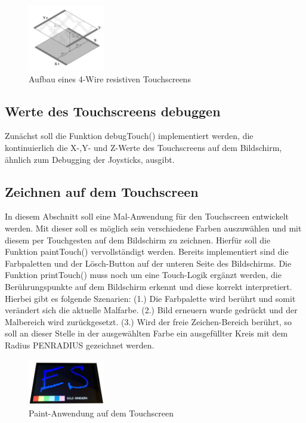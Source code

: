\begin{figure}[htbp]
	\centering
	\includegraphics[width=0.3\textwidth]{./05_c/figures/ResistiveTS.png}
	\caption{Aufbau eines 4-Wire resistiven Touchscreens }
	\label{fig:fourRSTouch}
\end{figure} 

\subsection{Werte des Touchscreens debuggen}
Zunächst soll die Funktion debugTouch() implementiert werden, die kontinuierlich die X-,Y- und Z-Werte des Touchscreens auf dem Bildschirm, ähnlich zum Debugging der Joysticks, ausgibt.

\subsection{Zeichnen auf dem Touchscreen}
In diesem Abschnitt soll eine Mal-Anwendung für den Touchscreen entwickelt werden. Mit dieser soll es möglich sein verschiedene Farben auszuwählen und mit diesem per Touchgesten auf dem Bildschirm zu zeichnen. Hierfür soll die Funktion paintTouch() vervollständigt werden. Bereits implementiert sind die Farbpaletten und der Lösch-Button auf der unteren Seite des Bildschirms. Die Funktion printTouch() muss noch um eine Touch-Logik ergänzt werden, die Berührungspunkte auf dem Bildschirm erkennt und diese korrekt interpretiert. Hierbei gibt es folgende Szenarien: 
(1.) Die Farbpalette wird berührt und somit verändert sich die aktuelle Malfarbe.
(2.) Bild erneuern wurde gedrückt und der Malbereich wird zurückgesetzt.
(3.) Wird der freie Zeichen-Bereich berührt, so soll an dieser Stelle in der ausgewählten Farbe ein ausgefüllter Kreis mit dem Radius PENRADIUS gezeichnet werden.
\begin{figure}[htbp]
	\centering
	\includegraphics[width=0.3\textwidth]{./05_c/figures/Paint-Szenario.png}
	\caption{Paint-Anwendung auf dem Touchscreen}
	\label{img:paintTouch}
\end{figure} 